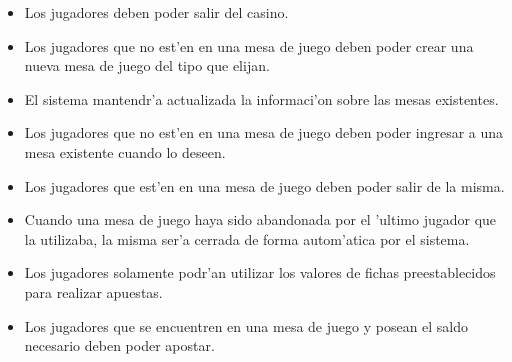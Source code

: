 \begin{itemize}
\item {} 

 Los jugadores deben poder salir del casino.
 
\item {} 

 Los jugadores que no est'en en una mesa de juego deben poder crear una nueva mesa de juego del tipo que elijan.

\item {} 

 El sistema mantendr'a actualizada la informaci'on sobre las mesas existentes.

\item {} 

 Los jugadores que no est'en en una mesa de juego deben poder ingresar a una mesa existente cuando lo deseen.

\item {} 

 Los jugadores que est'en en una mesa de juego deben poder salir de la misma.

\item {} 

 Cuando una mesa de juego haya sido abandonada por el 'ultimo jugador que la utilizaba, la misma ser'a cerrada de forma autom'atica por el sistema.

\item {} 

 Los jugadores solamente podr'an utilizar los valores de fichas preestablecidos para realizar apuestas.

\item {} 

 Los jugadores que se encuentren en una mesa de juego y posean el saldo necesario deben poder apostar.


\end{itemize}
